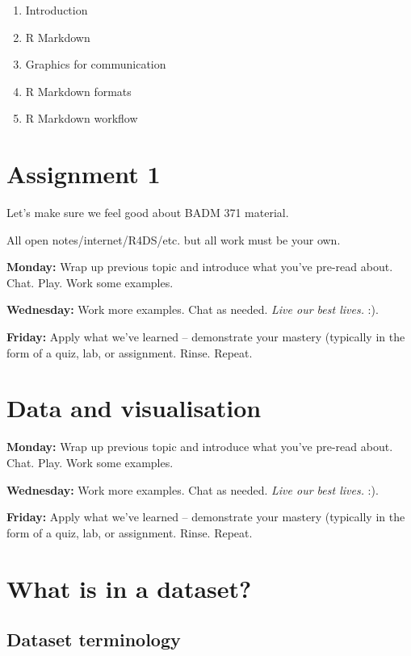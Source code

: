 \documentclass[
]{book}
\providecommand{\tightlist}{%
  \setlength{\itemsep}{0pt}\setlength{\parskip}{0pt}}
\theoremstyle{definition}
\theoremstyle{definition}
\theoremstyle{definition}
\theoremstyle{definition}
\theoremstyle{remark}
\begin{document}
\begin{enumerate}
\def\labelenumi{\arabic{enumi})}
\setcounter{enumi}{25}
\tightlist
\item
  Introduction
\item
  R Markdown
\item
  Graphics for communication
\item
  R Markdown formats
\item
  R Markdown workflow
\end{enumerate}

\hypertarget{assignment-1}{%
\chapter{Assignment 1}\label{assignment-1}}

Let's make sure we feel good about BADM 371 material.

All open notes/internet/R4DS/etc. but all work must be your own.

\textbf{Monday:} Wrap up previous topic and introduce what you've pre-read about. Chat. Play. Work some examples.

\textbf{Wednesday:} Work more examples. Chat as needed. \emph{Live our best lives.} :).

\textbf{Friday:} Apply what we've learned -- demonstrate your mastery (typically in the form of a quiz, lab, or assignment. Rinse. Repeat.

\hypertarget{data-and-visualisation}{%
\chapter{Data and visualisation}\label{data-and-visualisation}}

\textbf{Monday:} Wrap up previous topic and introduce what you've pre-read about. Chat. Play. Work some examples.

\textbf{Wednesday:} Work more examples. Chat as needed. \emph{Live our best lives.} :).

\textbf{Friday:} Apply what we've learned -- demonstrate your mastery (typically in the form of a quiz, lab, or assignment. Rinse. Repeat.

\hypertarget{what-is-in-a-dataset}{%
\chapter{What is in a dataset?}\label{what-is-in-a-dataset}}

\hypertarget{dataset-terminology}{%
\section{Dataset terminology}\label{dataset-terminology}}
\end{document}
